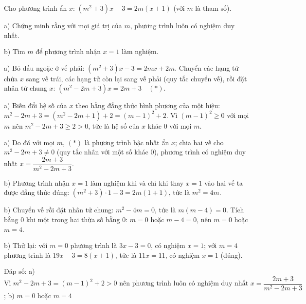 \begin{problem}[8DS-PT1-028]
Cho phương trình ẩn $x$: $(m^2 + 3)x - 3 = 2m(x + 1)$ (với $m$ là tham số).

a) Chứng minh rằng với mọi giá trị của $m$, phương trình luôn có nghiệm duy nhất.

b) Tìm $m$ để phương trình nhận $x = 1$ làm nghiệm.

\begin{solution}
a) Bỏ dấu ngoặc ở vế phải: $(m^2 + 3)x - 3 = 2mx + 2m$. Chuyển các hạng tử chứa $x$ sang vế trái, các hạng tử còn lại sang vế phải (quy tắc chuyển vế), rồi đặt nhân tử chung $x$: $(m^2 - 2m + 3)x = 2m + 3 \quad (*)$.

a) Biến đổi hệ số của $x$ theo hằng đẳng thức bình phương của một hiệu: $m^2 - 2m + 3 = (m^2 - 2m + 1) + 2 = (m - 1)^2 + 2$. Vì $(m - 1)^2 \geq 0$ với mọi $m$ nên $m^2 - 2m + 3 \geq 2 > 0$, tức là hệ số của $x$ khác $0$ với mọi $m$.

a) Do đó với mọi $m$, $(*)$ là phương trình bậc nhất ẩn $x$; chia hai vế cho $m^2 - 2m + 3 \neq 0$ (quy tắc nhân với một số khác $0$), phương trình có nghiệm duy nhất $x = \dfrac{2m + 3}{m^2 - 2m + 3}$.

b) Phương trình nhận $x = 1$ làm nghiệm khi và chỉ khi thay $x = 1$ vào hai vế ta được đẳng thức đúng: $(m^2 + 3) \cdot 1 - 3 = 2m(1 + 1)$, tức là $m^2 = 4m$.

b) Chuyển vế rồi đặt nhân tử chung: $m^2 - 4m = 0$, tức là $m(m - 4) = 0$. Tích bằng $0$ khi một trong hai thừa số bằng $0$: $m = 0$ hoặc $m - 4 = 0$, nên $m = 0$ hoặc $m = 4$.

b) Thử lại: với $m = 0$ phương trình là $3x - 3 = 0$, có nghiệm $x = 1$; với $m = 4$ phương trình là $19x - 3 = 8(x + 1)$, tức là $11x = 11$, có nghiệm $x = 1$ (đúng).

Đáp số: a) $\boxed{\text{Vì } m^2 - 2m + 3 = (m - 1)^2 + 2 > 0 \text{ nên phương trình luôn có nghiệm duy nhất } x = \dfrac{2m + 3}{m^2 - 2m + 3}}$; b) $\boxed{m = 0 \text{ hoặc } m = 4}$
\end{solution}
\end{problem}

